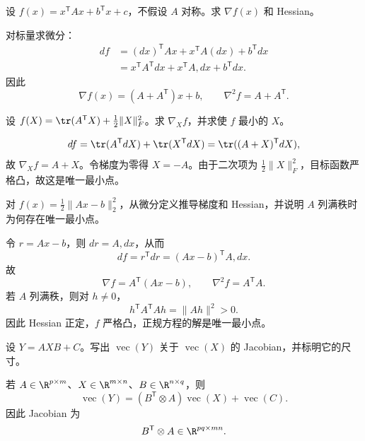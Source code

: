 %
%

\begin{exercise}[level=basic]
设 $f(x)=x^{\mathsf T}Ax+b^{\mathsf T}x+c$，不假设 $A$ 对称。求 $\nabla f(x)$ 和 Hessian。
\begin{solution}
对标量求微分：
\begin{align*}
df
&=(dx)^{\mathsf T}Ax+x^{\mathsf T}A(dx)+b^{\mathsf T}dx\\
&=x^{\mathsf T}A^{\mathsf T}dx+x^{\mathsf T}A,dx+b^{\mathsf T}dx.
\end{align*}
因此
\[
\nabla f(x)=(A+A^{\mathsf T})x+b,
\qquad
\nabla^2f=A+A^{\mathsf T}.
\]
\end{solution}
\end{exercise}

\begin{exercise}[level=basic]
设 $f(X)=\tr(A^{\mathsf T}X)+\frac12\lVert X\rVert_F^2$。求 $\nabla_Xf$，并求使 $f$ 最小的 $X$。
\begin{solution}
\[
df=\tr(A^{\mathsf T}dX)+\tr(X^{\mathsf T}dX)
=\tr((A+X)^{\mathsf T}dX),
\]
故 $\nabla_Xf=A+X$。令梯度为零得 $X=-A$。由于二次项为
$\frac12\lVert X\rVert_F^2$，目标函数严格凸，故这是唯一最小点。
\end{solution}
\end{exercise}

\begin{exercise}[level=basic]
对 $f(x)=\frac12\lVert Ax-b\rVert_2^2$，从微分定义推导梯度和 Hessian，并说明 $A$ 列满秩时为何存在唯一最小点。
\begin{solution}
令 $r=Ax-b$，则 $dr=A,dx$，从而
\[
df=r^{\mathsf T}dr=(Ax-b)^{\mathsf T}A,dx.
\]
故
\[
\nabla f=A^{\mathsf T}(Ax-b),
\qquad
\nabla^2f=A^{\mathsf T}A.
\]
若 $A$ 列满秩，则对 $h\ne0$，
\[
h^{\mathsf T}A^{\mathsf T}Ah=\lVert Ah\rVert^2>0.
\]
因此 Hessian 正定，$f$ 严格凸，正规方程的解是唯一最小点。
\end{solution}
\end{exercise}

\begin{exercise}[level=basic]
设 $Y=AXB+C$。写出 $\operatorname{vec}(Y)$ 关于 $\operatorname{vec}(X)$ 的 Jacobian，并标明它的尺寸。
\begin{solution}
若 $A\in\R^{p\times m}$、$X\in\R^{m\times n}$、$B\in\R^{n\times q}$，则
\[
\operatorname{vec}(Y)
=(B^{\mathsf T}\otimes A)\operatorname{vec}(X)
+\operatorname{vec}(C).
\]
因此 Jacobian 为
\[
B^{\mathsf T}\otimes A\in\R^{pq\times mn}.
\]
\end{solution}
\end{exercise}

